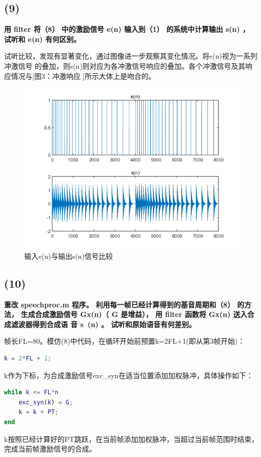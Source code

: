 \documentclass[10pt]{article}
\begin{document}
\subsection*{(9)}
\textbf{\color{gray}用 filter 将（8） 中的激励信号 e(n) 输入到（1） 的系统中计算输出 s(n) ， 试听和
e(n) 有何区别。}

试听比较，发现有显著变化，通过图像进一步观察其变化情况。将e(n)视为一系列冲激信号
的叠加，则s(n)则对应为各冲激信号响应的叠加。各个冲激信号及其响应情况与[图3：冲激响应
]所示大体上是吻合的。
\begin{figure}[h]
	\centering
	\begin{minipage}{0.49\linewidth}
		\centering
		\includegraphics[width=0.7\linewidth]{drawing2-9.png}
		\caption{输入e(n)与输出s(n)信号比较}
	\end{minipage}
\end{figure}
\subsection*{(10)}
\textbf{\color{gray}重改 speechproc.m 程序。 利用每一帧已经计算得到的基音周期和（8） 的方法，
生成合成激励信号 Gx(n)（ G 是增益）， 用 filter 函数将 Gx(n) 送入合成滤波器得到合成语
音 s~(n) 。 试听和原始语音有何差别。}

帧长FL=80。模仿(8)中代码，在循环开始前预置k=2FL+1(即从第3帧开始)：
\begin{lstlisting}[language=matlab]
k = 2*FL + 1;
\end{lstlisting}
k作为下标，为合成激励信号exc\_syn在适当位置添加加权脉冲，具体操作如下：
\begin{lstlisting}[language=matlab]
while k <= FL*n
    exc_syn(k) = G;
    k = k + PT;
end
\end{lstlisting}
k按照已经计算好的PT跳跃，在当前帧添加加权脉冲，当超过当前帧范围时结束，
完成当前帧激励信号的合成。
\end{document}
